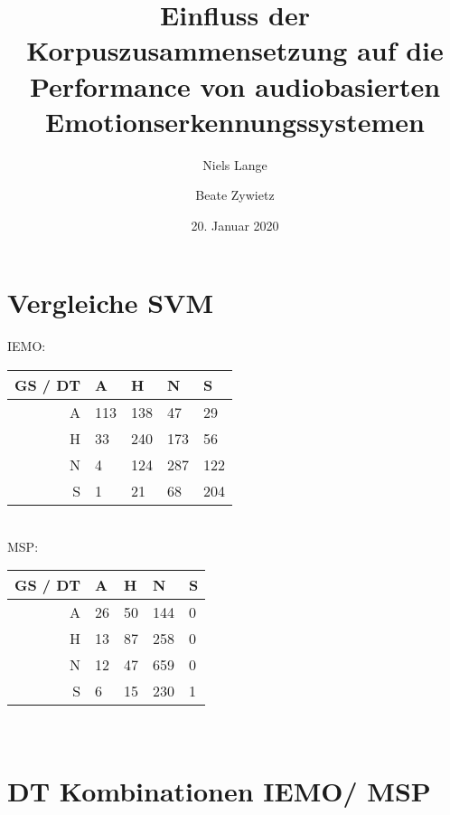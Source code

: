 \documentclass{article}
\begin{document}
\title{Einfluss der Korpuszusammensetzung auf die Performance von audiobasierten Emotionserkennungssystemen}
\author{Niels Lange \and Beate Zywietz}
\date{20. Januar 2020}
\maketitle


\section{Vergleiche SVM}

IEMO:
\begin{tabular}{|r|llll|}
\hline
GS / DT & A & H & N & S \\
\hline
A & 113 & 138 & 47 & 29 \\
H & 33 & 240 & 173 & 56 \\
N & 4 & 124 & 287 & 122 \\
S & 1 & 21 & 68 & 204 \\
\hline
\end{tabular} \\
MSP:
\begin{tabular}{|r|llll|}
\hline
GS / DT & A & H & N & S \\
\hline
A & 26 & 50 & 144 & 0 \\
H & 13 & 87 & 258 & 0 \\
N & 12 & 47 & 659 & 0 \\
S & 6 & 15 & 230 & 1 \\
\hline
\end{tabular} \\

\section{DT Kombinationen IEMO/ MSP}
\end{document}
